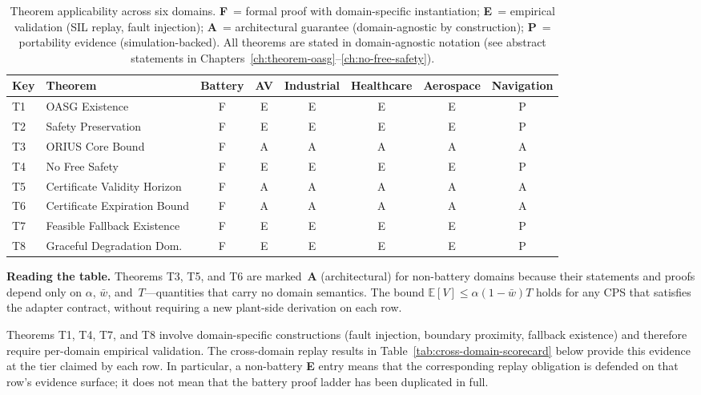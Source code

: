 \begin{table}[htbp]
\centering
\caption{Theorem applicability across six domains.
  \textbf{F}~= formal proof with domain-specific instantiation;
  \textbf{E}~= empirical validation (SIL replay, fault injection);
  \textbf{A}~= architectural guarantee (domain-agnostic by construction);
  \textbf{P}~= portability evidence (simulation-backed).
  All theorems are stated in domain-agnostic notation (see abstract
  statements in Chapters~\ref{ch:theorem-oasg}--\ref{ch:no-free-safety}).}
\label{tab:theorem-applicability}
\begin{tabular}{llcccccc}
\toprule
\textbf{Key} & \textbf{Theorem} & \textbf{Battery} & \textbf{AV} &
  \textbf{Industrial} & \textbf{Healthcare} & \textbf{Aerospace} &
  \textbf{Navigation} \\
\midrule
T1 & OASG Existence              & F & E & E & E & E & P \\
T2 & Safety Preservation         & F & E & E & E & E & P \\
T3 & ORIUS Core Bound            & F & A & A & A & A & A \\
T4 & No Free Safety              & F & E & E & E & E & P \\
T5 & Certificate Validity Horizon & F & A & A & A & A & A \\
T6 & Certificate Expiration Bound & F & A & A & A & A & A \\
T7 & Feasible Fallback Existence & F & E & E & E & E & P \\
T8 & Graceful Degradation Dom.\  & F & E & E & E & E & P \\
\bottomrule
\end{tabular}
\end{table}

\noindent\textbf{Reading the table.}
Theorems T3, T5, and T6 are marked~\textbf{A} (architectural) for
non-battery domains because their statements and proofs depend only on
$\alpha$, $\bar{w}$, and~$T$---quantities that carry no domain semantics.
The bound $\mathbb{E}[V] \le \alpha(1-\bar{w})T$ holds for any CPS
that satisfies the adapter contract, without requiring a new plant-side
derivation on each row.

Theorems T1, T4, T7, and T8 involve domain-specific constructions
(fault injection, boundary proximity, fallback existence) and therefore
require per-domain empirical validation.  The cross-domain replay results
in Table~\ref{tab:cross-domain-scorecard} below provide this evidence at
the tier claimed by each row.  In particular, a non-battery \textbf{E}
entry means that the corresponding replay obligation is defended on that
row's evidence surface; it does not mean that the battery proof ladder
has been duplicated in full.

